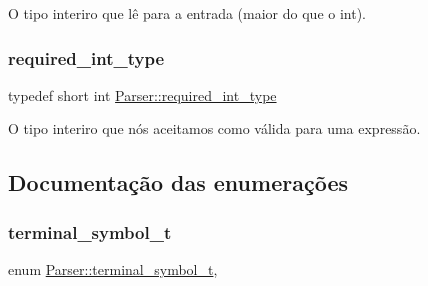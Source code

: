 O tipo interiro que lê para a entrada (maior do que o int). 

\mbox{\label{classParser_a6fda6745fb8e655fb2ee8e2d47dc2bed}} 
\subsubsection{\texorpdfstring{required\+\_\+int\+\_\+type}{required\_int\_type}}
{\footnotesize\ttfamily typedef short int \hyperlink{classParser_a6fda6745fb8e655fb2ee8e2d47dc2bed}{Parser\+::required\+\_\+int\+\_\+type}}



O tipo interiro que nós aceitamos como válida para uma expressão. 



\subsection{Documentação das enumerações}
\mbox{\label{classParser_a7d49b050a3c0df9e37ff81c5099be049}} 
\subsubsection{\texorpdfstring{terminal\+\_\+symbol\+\_\+t}{terminal\_symbol\_t}}
{\footnotesize\ttfamily enum \hyperlink{classParser_a7d49b050a3c0df9e37ff81c5099be049}{Parser\+::terminal\+\_\+symbol\+\_\+t}\hspace{0.3cm}{\ttfamily [strong]}, {\ttfamily [private]}}

